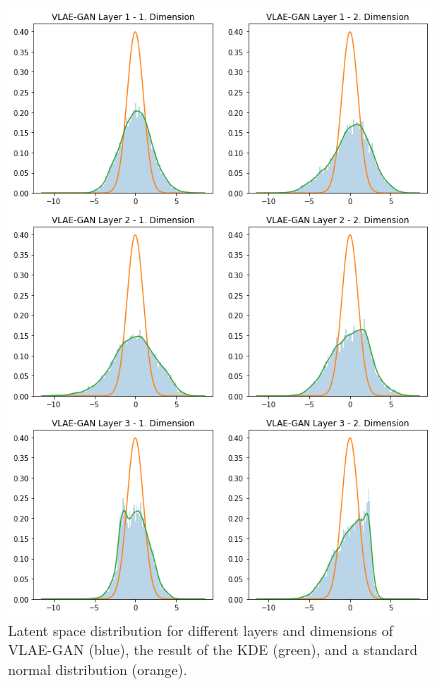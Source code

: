 \documentclass[11pt,a4paper]{article}
\begin{document}
\begin{figure}[H]
\centering
\includegraphics[width=.8\textwidth]{images/generated_vs_true/vlae_gan_kde.png}
\caption[\ac{VLAE}-\ac{GAN} Estimated Latent Space Distribution]{Latent space distribution for different layers and dimensions of \ac{VLAE}-\ac{GAN} (blue), the result of the \ac{KDE} (green), and a standard normal distribution (orange).}
\end{figure}


\pagebreak
\end{document}

